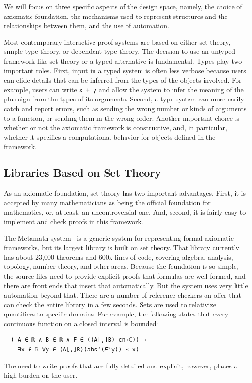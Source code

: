 \documentclass[sigplan]{acmart}\settopmatter{}
\begin{document}
We will focus on three specific aspects of the design space, namely, the choice of axiomatic foundation, the mechanisms used to represent structures and the relationships between them, and the use of automation.

Most contemporary interactive proof systems are based on either set theory, simple type theory, or dependent type theory.
The decision to use an untyped framework like set theory or a typed alternative is fundamental.
Types play two important roles.
First, input in a typed system is often less verbose because users can elide details that can be inferred from the types of the objects involved.
For example, users can write \lstinline{x + y} and allow the system to infer the meaning of the plus sign from the types of its arguments.
Second, a type system can more easily catch and report errors, such as sending the wrong number or kinds of arguments to a function, or sending them in the wrong order. Another important choice is whether or not the axiomatic framework is constructive, and, in particular, whether it specifies a computational behavior for objects defined in the framework.

\subsection{Libraries Based on Set Theory}

As an axiomatic foundation, set theory has two important advantages.
First, it is accepted by many mathematicians as being the official foundation for mathematics, or, at least, an uncontroversial one.
And, second, it is fairly easy to implement and check proofs in this framework.

The Metamath system~\cite{Meg19} is a generic system for representing formal axiomatic frameworks, but its largest library is built on set theory.
That library currently has about 23,000 theorems and 600k lines of code, covering algebra, analysis, topology, number theory, and other areas.
Because the foundation is so simple, the source files need to provide explicit proofs that formulas are well formed, and there are front ends that insert that automatically.
But the system uses very little automation beyond that.
There are a number of reference checkers on offer that can check the entire library in a few seconds.
Sets are used to relativize quantifiers to specific domains.
For example, the following states that every continuous function on a closed interval is bounded:
\begin{verbatim}
  ((A ∈ ℝ ∧ B ∈ ℝ ∧ F ∈ ((A[,]B)–cn→ℂ)) →
    ∃x ∈ ℝ ∀y ∈ (A[,]B)(abs‘(𝐹‘y)) ≤ x)
\end{verbatim}
The need to write proofs that are fully detailed and explicit, however, places a high burden on the user.
\end{document}
